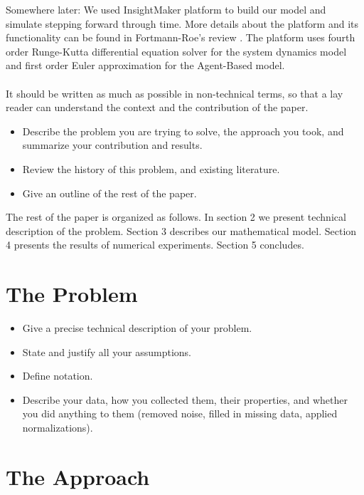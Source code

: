 \documentclass[10pt]{article}
\begin{document}
Somewhere later: We used InsightMaker platform to build our model and simulate stepping forward through time. More details about the platform and its functionality can be found in Fortmann-Roe's review \cite{FortmannRoe}. The platform uses fourth order Runge-Kutta differential equation solver for the system dynamics model and  first order Euler approximation for the Agent-Based model.
\\\\

It should be written as much as possible in non-technical terms, so that a
lay reader can understand the context and the contribution of the paper.

\begin{itemize}
\item Describe the problem you are trying to solve, the approach
you took, and summarize your contribution and results.

\item Review the history of this problem, and existing literature.

\item Give an outline of the rest of the paper.
\end{itemize}

The rest of the paper is organized as follows. In section 2 we present technical description of the problem. Section 3 describes our mathematical model. Section 4 presents the results of numerical experiments. Section 5 concludes.

\section{The Problem}
\begin{itemize}
\item Give a precise technical description of your problem. 

\item State and justify all your assumptions. 

\item Define notation. 

\item Describe your data, how you collected them, their properties,
and whether you did 
anything to them (removed noise, filled in missing data, 
applied normalizations).
\end{itemize}

\section{The Approach}
\end{document}
